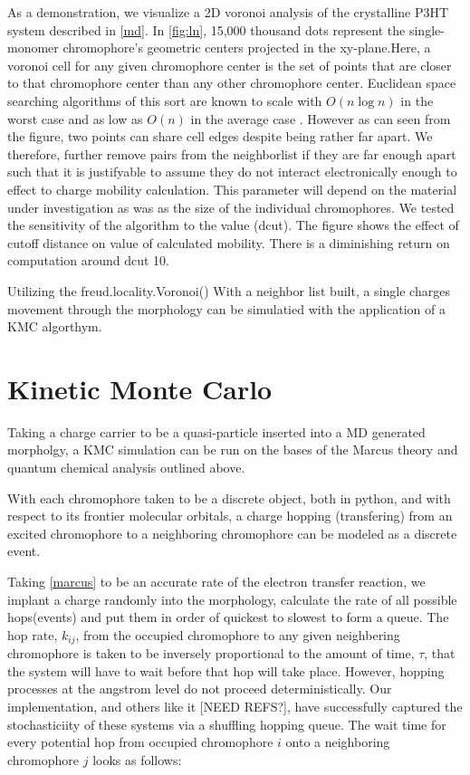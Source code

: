 As a demonstration, we visualize a 2D voronoi analysis of the crystalline 
P3HT system described in \autoref{md}.
In \autoref{fig:ln}, 15,000 thousand dots represent the single-monomer chromophore's geometric centers projected
in the xy-plane.Here,
a voronoi cell for any given chromophore center is the set of points that are closer to that chromophore
center than any other chromophore center. Euclidean space searching algorithms of
this sort are known to scale with $O(n\log{n})$ in the worst case and as low as $O(n)$ in the average case
\cite{Bentley1980}.
However as can seen from the figure, two points can share cell edges despite being rather far apart. We
therefore, further remove pairs from the neighborlist if they are far enough apart such that it is justifyable
to assume they do not interact electronically enough to effect to charge mobility calculation. This parameter will
depend on the material under investigation as was as the size of the individual chromophores. We tested the
sensitivity of the algorithm to the value (dcut). The figure shows the effect of cutoff distance on value of
calculated mobility. There is a diminishing return on computation around dcut 10. 

Utilizing the freud.locality.Voronoi() 
With a neighbor list built, a single charges movement through the morphology can be simulatied with the
application of a KMC algorthym.

\section{Kinetic Monte Carlo}
\label{KMC}
Taking a charge carrier to be a quasi-particle inserted into a MD generated morpholgy, a KMC
simulation can be run on the bases of the Marcus theory and quantum chemical analysis outlined above. 

With each chromophore taken to be a discrete object, both in python, and with respect to its frontier
molecular orbitals, a charge hopping (transfering) from an excited chromophore to a neighboring chromophore can be modeled
as a discrete event.

Taking \autoref{marcus} to be an
accurate rate of the electron transfer reaction, we implant a charge randomly into the morphology, calculate
the rate of all possible hops(events)
and put them in order of quickest to slowest to form a queue. The hop rate, $k_{ij}$, from the occupied chromophore to any
given neighbering chromophore is taken to be
inversely proportional to the amount of time, $\tau$, that the system will have to wait before that hop will
take place. However, hopping processes at the angstrom level do not proceed deterministically. 
Our implementation, and others like it [NEED REFS?], have
successfully captured the stochasticiity of these systems via a shuffling hopping queue.
The wait time for every potential hop from occupied chromophore $i$ onto a
neighboring chromophore $j$ looks as follows:

